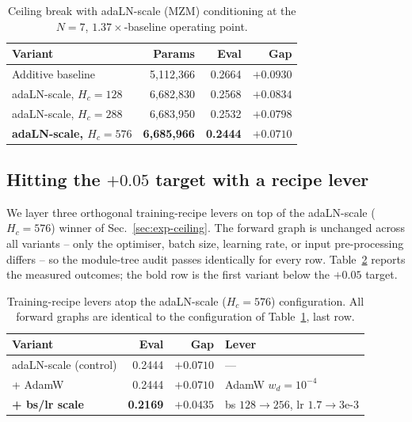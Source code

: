 \documentclass[conference]{IEEEtran}
\begin{document}
\begin{table}[tbp]
\caption{Ceiling break with adaLN-scale (MZM) conditioning at the
$N{=}7$, $1.37\times$-baseline operating point.}
\label{tab:ceiling}
\centering\footnotesize
\setlength{\tabcolsep}{4pt}
\renewcommand{\arraystretch}{1.1}
\begin{tabular}{@{}lrrr@{}}
\toprule
\textbf{Variant} & \textbf{Params} & \textbf{Eval} & \textbf{Gap}\\
\midrule
Additive baseline                        & 5{,}112{,}366 & 0.2664 & $+0.0930$\\
adaLN-scale, $H_c{=}128$                 & 6{,}682{,}830 & 0.2568 & $+0.0834$\\
adaLN-scale, $H_c{=}288$                 & 6{,}683{,}950 & 0.2532 & $+0.0798$\\
\textbf{adaLN-scale, $H_c{=}576$}        & \textbf{6{,}685{,}966} & \textbf{0.2444} & $\mathbf{+0.0710}$\\
\bottomrule
\end{tabular}
\end{table}

\subsection{Hitting the $+0.05$ target with a recipe lever}
\label{sec:exp-target}

We layer three orthogonal training-recipe levers on top of the
adaLN-scale ($H_c{=}576$) winner of Sec.~\ref{sec:exp-ceiling}.
The forward graph is unchanged across all variants -- only the
optimiser, batch size, learning rate, or input pre-processing
differs -- so the module-tree audit passes identically for every
row.  Table~\ref{tab:target} reports the measured outcomes;
the bold row is the first variant below the $+0.05$ target.

\begin{table}[tbp]
\caption{Training-recipe levers atop the adaLN-scale ($H_c{=}576$)
configuration.  All forward graphs are identical to the
configuration of Table~\ref{tab:ceiling}, last row.}
\label{tab:target}
\centering\footnotesize
\setlength{\tabcolsep}{4pt}
\renewcommand{\arraystretch}{1.1}
\begin{tabular}{@{}lrrl@{}}
\toprule
\textbf{Variant} & \textbf{Eval} & \textbf{Gap} & \textbf{Lever} \\
\midrule
adaLN-scale (control)            & 0.2444 & $+0.0710$ & --- \\
+ AdamW                          & 0.2444 & $+0.0710$ & AdamW $w_d{=}10^{-4}$ \\
\textbf{+ bs/lr scale}           & \textbf{0.2169} & $\mathbf{+0.0435}$ & bs $128{\to}256$, lr $1.7{\to}3$e-3 \\
\bottomrule
\end{tabular}
\end{table}
\end{document}
